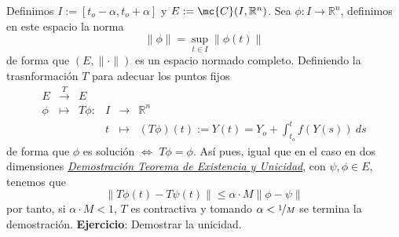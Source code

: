 \begin{dem}
    Definimos $I:=[t_o-\alpha, t_o+\alpha]$ y $E:=\mc{C}(I,\mathbb R^n)$. Sea $\phi: I \longrightarrow \mathbb R^n$, definimos en este espacio la norma 
    $$\|\phi\|=\sup_{t \in I} \|\phi(t)\|$$
    de forma que $(E, \|\cdot\|)$ es un espacio normado completo. Definiendo la trasnformación $T$ para adecuar los puntos fijos
    $$\begin{array}{rccccl}
        E & \overset{T}{\longrightarrow} & E  \\
        \phi & \longmapsto &  T \phi : & I & \longrightarrow & \mathbb R^n \\
         &&& t & \longmapsto &  \displaystyle (T \phi)(t):=Y(t)=Y_o+\int_{t_o}^t f(Y(s)) \: ds
    \end{array}$$
    de forma que $\phi$ es solución $\iff$ $T\phi=\phi$. Así pues, igual que en el caso en dos dimensiones \hyperref[demexuni]{\textit{Demostración Teorema de Existencia y Unicidad}}, con $\psi, \phi \in E$, tenemos que
    $$\|T\phi(t)-T\psi(t)\| \leq \alpha \cdot M \|\phi - \psi\|$$
    por tanto, si $\alpha \cdot M < 1$, $T$ es contractiva y tomando $\alpha < \nicefrac{1}{M}$ se termina la demostración. 
    \textbf{Ejercicio}: Demostrar la unicidad.
\end{dem}

